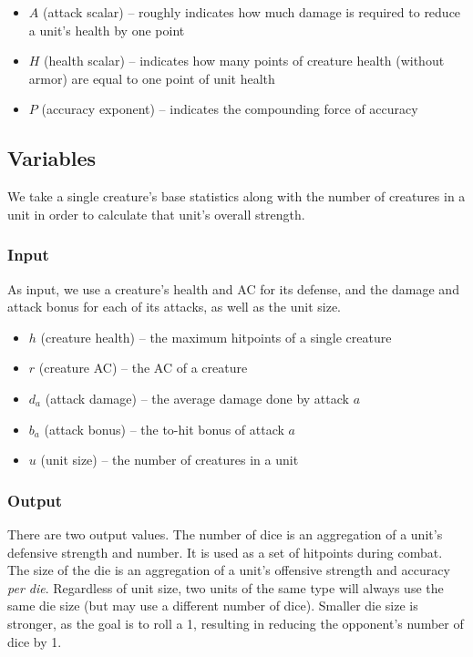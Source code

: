 \documentclass{article}
\begin{document}
\begin{itemize}
    \item $A$ (attack scalar) -- roughly indicates how much damage is required to reduce a unit's health by one point
    \item $H$ (health scalar) -- indicates how many points of creature health (without armor) are equal to one point of unit health
    \item $P$ (accuracy exponent) -- indicates the compounding force of accuracy
\end{itemize}

\subsection{Variables}

We take a single creature's base statistics along with the number of creatures in a unit
in order to calculate that unit's overall strength.

\subsubsection{Input}

As input, we use a creature's health and AC for its defense,
and the damage and attack bonus for each of its attacks,
as well as the unit size.

\begin{itemize}
    \item $h$ (creature health) -- the maximum hitpoints of a single creature
    \item $r$ (creature AC) -- the AC of a creature
    \item $d_a$ (attack damage) -- the average damage done by attack $a$
    \item $b_a$ (attack bonus) -- the to-hit bonus of attack $a$
    \item $u$ (unit size) -- the number of creatures in a unit
\end{itemize}

\subsubsection{Output}

There are two output values.
The number of dice is an aggregation of a unit's defensive strength and number.
It is used as a set of hitpoints during combat.
The size of the die is an aggregation
of a unit's offensive strength and accuracy \emph{per die}.
Regardless of unit size,
two units of the same type will always use the same die size
(but may use a different number of dice).
Smaller die size is stronger,
as the goal is to roll a 1,
resulting in reducing the opponent's number of dice by 1.
\end{document}
